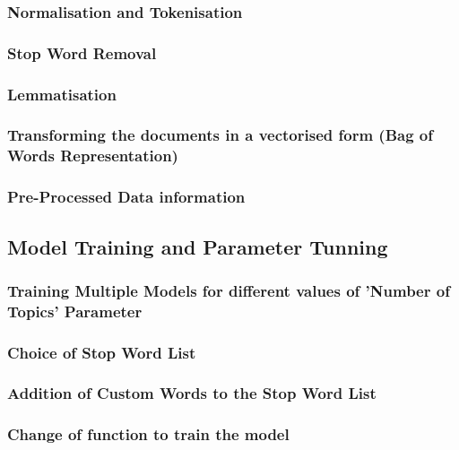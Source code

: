 \documentclass[twoside,11pt,a4paper]{article}
\begin{document}
\subsubsection{Normalisation and Tokenisation}

\subsubsection{Stop Word Removal}

\subsubsection{Lemmatisation}

\subsubsection{Transforming the documents in a vectorised form (Bag of Words Representation)}

\subsubsection{Pre-Processed Data information}



\clearpage
\subsection{Model Training and Parameter Tunning}

\subsubsection{Training Multiple Models for different values of 'Number of Topics' Parameter}

\subsubsection{Choice of Stop Word List}

\subsubsection{Addition of Custom Words to the Stop Word List}

\subsubsection{Change of function to train the model}
\end{document}
